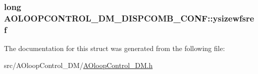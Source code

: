 \subsubsection[{ysizewfsref}]{\setlength{\rightskip}{0pt plus 5cm}long A\+O\+L\+O\+O\+P\+C\+O\+N\+T\+R\+O\+L\+\_\+\+D\+M\+\_\+\+D\+I\+S\+P\+C\+O\+M\+B\+\_\+\+C\+O\+N\+F\+::ysizewfsref}\label{structAOLOOPCONTROL__DM__DISPCOMB__CONF_a3beacc093a52b32e026717775db3ecfa}


The documentation for this struct was generated from the following file\+:\begin{DoxyCompactItemize}
\item 
src/\+A\+Oloop\+Control\+\_\+\+D\+M/\hyperlink{AOloopControl__DM_8h}{A\+Oloop\+Control\+\_\+\+D\+M.\+h}\end{DoxyCompactItemize}

